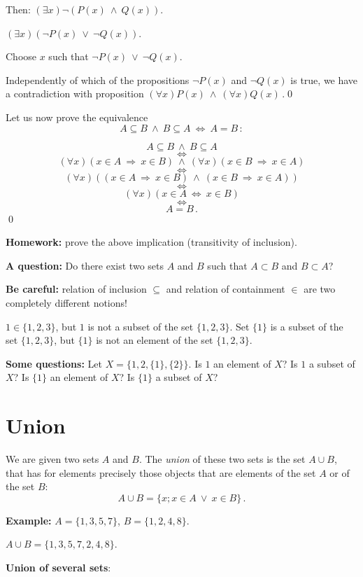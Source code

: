 \documentclass[11pt,paper=b5,footinclude,headinclude]{scrbook} %
\def\ali {{~\vee~}}
\def\inn {{~\wedge~}}
\def\sledi {{~\Rightarrow~}}
\def\cee {{~\Leftrightarrow~}}
\theoremstyle{remark}
\theoremstyle{definition} %
\theoremstyle{theorem} %
\begin{document}
Then:
$(\exists  x)\neg (P(x)\inn Q(x))$.

$(\exists  x)(\neg P(x)\ali \neg Q(x))$.

Choose $x$ such that $\neg P(x)\ali \neg Q(x)$.

Independently of which of the propositions $\neg P(x)$ and $\neg Q(x)$
is true, we have a contradiction with proposition
$(\forall x)P(x)\inn (\forall x)Q(x)\,.$\qed

\bigskip
Let us now prove the equivalence
$$A\subseteq B \inn B\subseteq A \cee A = B\,:$$

$$A\subseteq B \inn B\subseteq A$$
$$\cee$$
$$(\forall x)(x\in A\sledi x\in B) \inn (\forall x)(x\in B\sledi x\in A)$$
$$\cee$$
$$(\forall x)((x\in A\sledi x\in B) \inn (x\in B\sledi x\in A))$$
$$\cee$$
$$(\forall x)(x\in A\cee x\in B)$$
$$\cee$$
$$A = B\,.$$\qed


\textbf{ Homework:} prove the above implication (transitivity of inclusion).

\medskip
\textbf{ A question:} Do there exist two sets $A$ and $B$ such that $A\subset B$ and $B\subset A$?

\bigskip
\textbf{ Be careful:} relation of inclusion $\subseteq$ and relation of containment $\in$ are two completely different
notions!

$1\in\{1,2,3\}$, but $1$ is not a subset of the set $\{1,2,3\}$.
Set $\{1\}$ is a subset of the set $\{1,2,3\}$, but
$\{1\}$ is not an element of the set $\{1,2,3\}$.

\medskip

\textbf{ Some questions:} Let $X = \{1,2,\{1\},\{2\}\}$.
Is $1$ an element of $X$?
Is $1$ a subset of $X$?
Is $\{1\}$ an element of $X$?
Is $\{1\}$ a subset of $X$?

\bigskip

\section{Union}
We are given two sets $A$ and $B$. The {\em union} of these two sets is the set $A\cup B$,
that has for elements precisely those objects that are elements of the set $A$ or of the set $B$:
$$A\cup B = \{x; x\in A \ali x\in B\}\,.$$

\textbf{ Example:}
$A = \{1,3,5,7\}$, $B = \{1,2,4,8\}$.

$A\cup B = \{1,3,5,7,2,4,8\}$.

\medskip

\textbf{ Union of several sets}:
\end{document}
